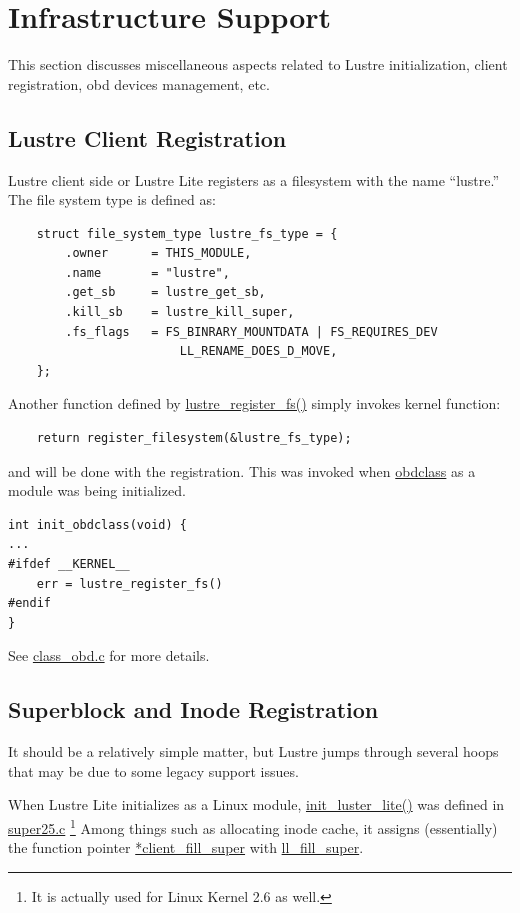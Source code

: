\section{Infrastructure Support}

This section discusses miscellaneous aspects related to Lustre initialization,
client registration, obd devices management, etc.

\subsection{Lustre Client Registration}

Lustre client side or Lustre Lite registers as a filesystem with the name
``lustre.''  The file system type is defined as:

\begin{Verbatim}
    struct file_system_type lustre_fs_type = {
        .owner      = THIS_MODULE,
        .name       = "lustre",
        .get_sb     = lustre_get_sb,
        .kill_sb    = lustre_kill_super,
        .fs_flags   = FS_BINRARY_MOUNTDATA | FS_REQUIRES_DEV 
                        LL_RENAME_DOES_D_MOVE,
    };
\end{Verbatim}

Another function defined by \url{lustre_register_fs()} simply invokes kernel
function:

\begin{Verbatim}
    return register_filesystem(&lustre_fs_type);
\end{Verbatim}

and will be done with the registration. This was invoked when \url{obdclass} as
a module was being initialized.
 
\begin{Verbatim}
int init_obdclass(void) {
...
#ifdef __KERNEL__
    err = lustre_register_fs()
#endif
}
\end{Verbatim}

See \url{class_obd.c} for more details.

\subsection{Superblock and Inode Registration} 

It should be a relatively simple matter, but Lustre jumps through several hoops
that may be due to some legacy support issues.

When Lustre Lite initializes as a Linux module, \url{init_luster_lite()} was
defined in \url{super25.c} \footnote{It is actually used for Linux Kernel 2.6 as well.} 
Among things such as allocating inode cache, it assigns (essentially)
the function pointer \url{*client_fill_super} with \url{ll_fill_super}.

